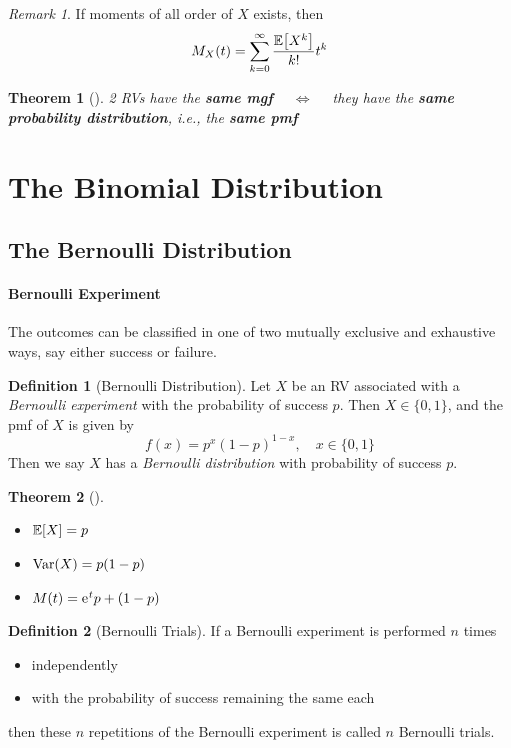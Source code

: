 \documentclass[10pt,UTF8]{article}
\newenvironment{definition box}
{\begin{tcolorbox}[colback=blue!5!white,colframe=blue!75!black,parbox=false,before upper=\par,before lower=\par]}
{\end{tcolorbox}}
\newenvironment{theorem box}
{\begin{tcolorbox}[colback=yellow!5!white,colframe=yellow!75!black,parbox=false,before upper=\par,before lower=\par]}
{\end{tcolorbox}}
\theoremstyle{definition}
\newtheorem{definition inner}{Definition}[section]
\newenvironment{definition}[1][]
{\begin{definition box}\begin{definition inner}[#1]\hfill\par}
{\end{definition inner}\end{definition box}}
\theoremstyle{plain}
\newtheorem{theorem inner}{Theorem}[section]
\newenvironment{theorem}[1][]
{\begin{theorem box}\begin{theorem inner}[#1]\hfill\par}
{\end{theorem inner}\end{theorem box}}
\theoremstyle{definition}
\newtheorem*{proof inner}{\textit{Proof}}
\theoremstyle{remark}
\newtheorem*{remark}{\textit{Remark}}
\newcommand{\e}{\mathrm{e}{\mkern 1 mu}}
\newcommand{\E}[1]{\mathbb{E}\qty[#1]}  %
\newcommand{\Var}[1]{\mathrm{Var}\qty(#1)}  %
\begin{document}
\begin{remark}
    If moments of all order of $X$ exists, then
    \begin{equation*}
        M_X(t) = \sum_{k=0}^{\infty} \frac{\E{X^k}}{k!} t^k
    \end{equation*}
\end{remark}

\begin{theorem}
    2 RVs have the \textbf{same mgf}
    $\quad\iff\quad$
    they have the \textbf{same probability distribution},
    i.e., the \textbf{same pmf}
\end{theorem}


\section{The Binomial Distribution}


\subsection{The Bernoulli Distribution}

\paragraph{Bernoulli Experiment}
The outcomes can be classified in one of two mutually
exclusive and exhaustive ways, say either success or failure.

\begin{definition}[Bernoulli Distribution]
    Let $X$ be an RV associated with a \emph{Bernoulli experiment} with the
probability of success $p$.
    Then $X\in\{0,1\}$, and the pmf of $X$ is given by
    \begin{equation*}
        f(x) = p^x (1-p)^{1-x},\quad x\in\{0,1\}
    \end{equation*}
    Then we say $X$ has a \emph{Bernoulli distribution} with probability of success $p$.
\end{definition}


\begin{theorem}
    \begin{itemize}
        \item $\E{X} = p$
        \item $\Var{X} = p(1-p)$
        \item $M(t) = \e^t p + (1-p)$
    \end{itemize}
\end{theorem}


\begin{definition}[Bernoulli Trials]
    If a Bernoulli experiment is performed $n$ times
    \begin{itemize}
        \item independently
        \item with the probability of success remaining the same each
    \end{itemize}
    then these $n$ repetitions of the Bernoulli experiment is called
    $n$ Bernoulli trials.
\end{definition}
\end{document}
